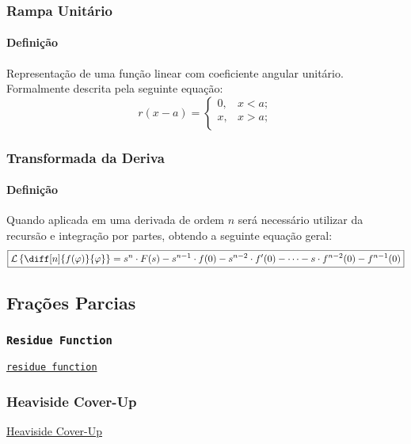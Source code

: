 \documentclass{article}
\begin{document}
\subsubsection{Rampa Unitário}
    \paragraph{Definição}Representação de uma função linear com coeficiente angular unitário. Formalmente descrita pela seguinte equação:
    \begin{equation}
        \boxed{
            r(x - a) = 
            \begin{cases}
                0, & x < a;\\
                x, & x > a;\\
            \end{cases}
        }
    \end{equation}

\subsubsection{Transformada da Deriva}
    \paragraph{Definição}Quando aplicada em uma derivada de ordem $n$ será necessário utilizar da recursão e integração por partes, obtendo a seguinte equação geral:
    \begin{equation}
        \boxed{
            \mathcal{L}\left\{\diff[n]{f(\varphi)}{\varphi}\right\} = 
            s^{n}\cdot F(s) - 
            s^{n-1} \cdot f(0) - 
            s^{n-2} \cdot f'(0) - \dots - 
            s \cdot f^{n-2}(0) - 
            f^{n-1}(0)
        }
    \end{equation}
\newpage

\subsection{Frações Parcias}
\subsubsection{\texttt{Residue Function}}
\href{https://www.mathworks.com/help/matlab/ref/residue.html}{\texttt{residue function}}

\subsubsection{Heaviside Cover-Up}
\href{https://en.wikipedia.org/wiki/Heaviside_cover-up_method}{Heaviside Cover-Up}
\end{document}
